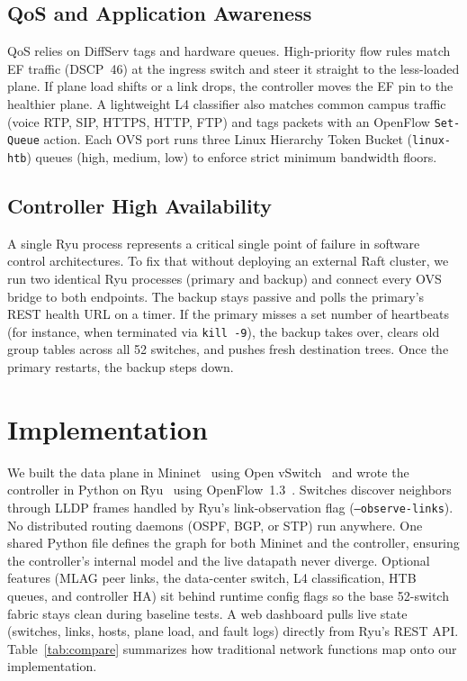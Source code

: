 \documentclass[conference]{IEEEtran}
\begin{document}
\subsection{QoS and Application Awareness}
QoS relies on DiffServ tags and hardware queues. High-priority flow rules match EF traffic (DSCP~46) at the ingress switch and steer it straight to the less-loaded plane. If plane load shifts or a link drops, the controller moves the EF pin to the healthier plane. A lightweight L4 classifier also matches common campus traffic (voice RTP, SIP, HTTPS, HTTP, FTP) and tags packets with an OpenFlow \texttt{Set-Queue} action. Each OVS port runs three Linux Hierarchy Token Bucket (\texttt{linux-htb}) queues (high, medium, low) to enforce strict minimum bandwidth floors.

\subsection{Controller High Availability}
A single Ryu process represents a critical single point of failure in software control architectures. To fix that without deploying an external Raft cluster, we run two identical Ryu processes (primary and backup) and connect every OVS bridge to both endpoints. The backup stays passive and polls the primary's REST health URL on a timer. If the primary misses a set number of heartbeats (for instance, when terminated via \texttt{kill -9}), the backup takes over, clears old group tables across all 52 switches, and pushes fresh destination trees. Once the primary restarts, the backup steps down.

\section{Implementation}\label{sec:impl}
We built the data plane in Mininet~\cite{mininet} using Open vSwitch~\cite{ovs} and wrote the controller in Python on Ryu~\cite{ryu} using OpenFlow~1.3~\cite{openflow}. Switches discover neighbors through LLDP frames handled by Ryu's link-observation flag (\texttt{--observe-links}). No distributed routing daemons (OSPF, BGP, or STP) run anywhere. One shared Python file defines the graph for both Mininet and the controller, ensuring the controller's internal model and the live datapath never diverge. Optional features (MLAG peer links, the data-center switch, L4 classification, HTB queues, and controller HA) sit behind runtime config flags so the base 52-switch fabric stays clean during baseline tests. A web dashboard pulls live state (switches, links, hosts, plane load, and fault logs) directly from Ryu's REST API. Table~\ref{tab:compare} summarizes how traditional network functions map onto our implementation.
\end{document}
